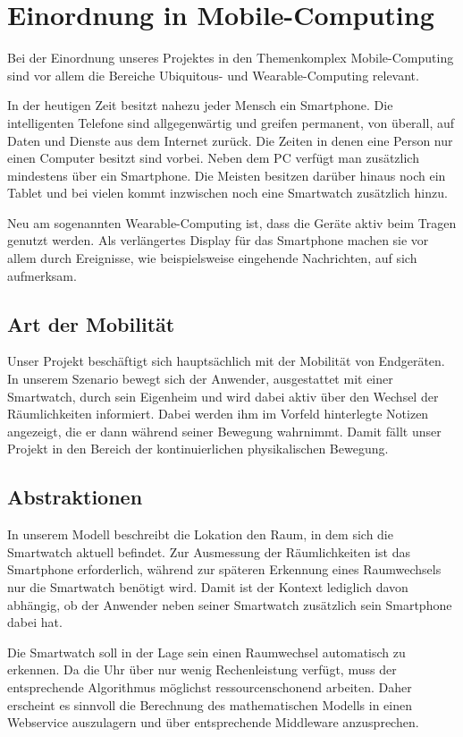 \section{Einordnung in Mobile-Computing}
Bei der Einordnung unseres Projektes in den Themenkomplex Mobile-Computing sind vor allem die Bereiche Ubiquitous- und Wearable-Computing relevant. 

In der heutigen Zeit besitzt nahezu jeder Mensch ein Smartphone. Die intelligenten Telefone sind allgegenwärtig und greifen permanent, von überall, auf Daten und Dienste aus dem Internet zurück. Die Zeiten in denen eine Person nur einen Computer besitzt sind vorbei. Neben dem PC verfügt man zusätzlich mindestens über ein Smartphone. Die Meisten besitzen darüber hinaus noch ein Tablet und bei vielen kommt inzwischen noch eine Smartwatch zusätzlich hinzu.

Neu am sogenannten Wearable-Computing ist, dass die Geräte aktiv beim Tragen genutzt werden. Als verlängertes Display für das Smartphone machen sie vor allem durch Ereignisse, wie beispielsweise eingehende Nachrichten, auf sich aufmerksam. 

\subsection{Art der Mobilität}
Unser Projekt beschäftigt sich hauptsächlich mit der Mobilität von Endgeräten. In unserem Szenario bewegt sich der Anwender, ausgestattet mit einer Smartwatch, durch sein Eigenheim und wird dabei aktiv über den Wechsel der Räumlichkeiten informiert. Dabei werden ihm im Vorfeld hinterlegte Notizen angezeigt, die er dann während seiner Bewegung wahrnimmt. Damit fällt unser Projekt in den Bereich der kontinuierlichen physikalischen Bewegung.

\subsection{Abstraktionen}
In unserem Modell beschreibt die Lokation den Raum, in dem sich die Smartwatch aktuell befindet. Zur Ausmessung der Räumlichkeiten ist das Smartphone erforderlich, während zur späteren Erkennung eines Raumwechsels nur die Smartwatch benötigt wird. Damit ist der Kontext lediglich davon abhängig, ob der Anwender neben seiner Smartwatch zusätzlich sein Smartphone dabei hat.

Die Smartwatch soll in der Lage sein einen Raumwechsel automatisch zu erkennen. Da die Uhr über nur wenig Rechenleistung verfügt, muss der entsprechende Algorithmus möglichst ressourcenschonend arbeiten. Daher erscheint es sinnvoll die Berechnung des mathematischen Modells in einen Webservice auszulagern und über entsprechende Middleware anzusprechen.

